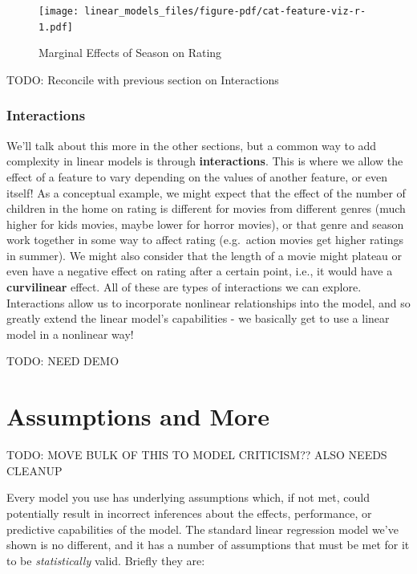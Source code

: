 \documentclass[
  letterpaper,
]{krantz}
\begin{document}
\begin{figure}

{\centering \texttt{[image: linear\_models\_files/figure-pdf/cat-feature-viz-r-1.pdf]}

}

\caption{Marginal Effects of Season on Rating}

\end{figure}

TODO: Reconcile with previous section on Interactions

\subsubsection{Interactions}\label{sec-lm-interactions}

We'll talk about this more in the other sections, but a common way to
add complexity in linear models is through \textbf{interactions}. This
is where we allow the effect of a feature to vary depending on the
values of another feature, or even itself! As a conceptual example, we
might expect that the effect of the number of children in the home on
rating is different for movies from different genres (much higher for
kids movies, maybe lower for horror movies), or that genre and season
work together in some way to affect rating (e.g.~action movies get
higher ratings in summer). We might also consider that the length of a
movie might plateau or even have a negative effect on rating after a
certain point, i.e., it would have a \textbf{curvilinear} effect. All of
these are types of interactions we can explore. Interactions allow us to
incorporate nonlinear relationships into the model, and so greatly
extend the linear model's capabilities - we basically get to use a
linear model in a nonlinear way!

TODO: NEED DEMO

\section{Assumptions and More}\label{sec-lm-assumptions}

TODO: MOVE BULK OF THIS TO MODEL CRITICISM?? ALSO NEEDS CLEANUP

Every model you use has underlying assumptions which, if not met, could
potentially result in incorrect inferences about the effects,
performance, or predictive capabilities of the model. The standard
linear regression model we've shown is no different, and it has a number
of assumptions that must be met for it to be \emph{statistically} valid.
Briefly they are:
\end{document}
